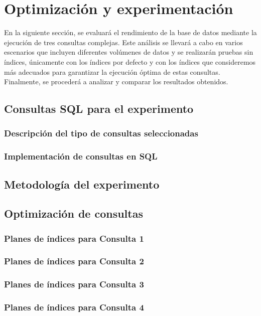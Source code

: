 \section{Optimización y experimentación} {En la siguiente sección, se evaluará el rendimiento de la base de datos mediante la ejecución de tres consultas complejas. Este análisis se llevará a cabo en varios escenarios que incluyen diferentes volúmenes de datos y se realizarán pruebas sin índices, únicamente con los índices por defecto y con los índices que consideremos más adecuados para garantizar la ejecución óptima de estas consultas. Finalmente, se procederá a analizar y comparar los resultados obtenidos.}
\subsection{Consultas SQL para el experimento}
\subsubsection{Descripción del tipo de consultas seleccionadas}
\subsubsection{Implementación de consultas en SQL}

\subsection{Metodología del experimento}

\subsection{Optimización de consultas}
\subsubsection{Planes de índices para Consulta 1}
\subsubsection{Planes de índices para Consulta 2}
\subsubsection{Planes de índices para Consulta 3}
\subsubsection{Planes de índices para Consulta 4}

